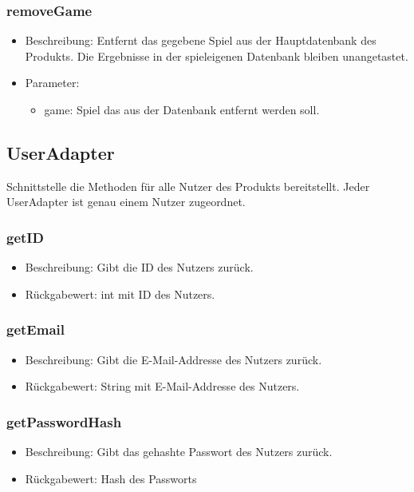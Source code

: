 \documentclass[a4paper]{scrreprt}
\begin{document}
	\subsubsection{removeGame}
	\begin{itemize}
		\item Beschreibung: Entfernt das gegebene Spiel aus der Hauptdatenbank des Produkts.
		Die Ergebnisse in der spieleigenen Datenbank bleiben unangetastet.
		\item Parameter:
		\begin{itemize}
			\item game: Spiel das aus der Datenbank entfernt werden soll.
		\end{itemize}
	\end{itemize}

	\subsection{UserAdapter}
	Schnittstelle die Methoden für alle Nutzer des Produkts bereitstellt.
	Jeder UserAdapter ist genau einem Nutzer zugeordnet.

	\subsubsection{getID}
	\begin{itemize}
		\item Beschreibung: Gibt die ID des Nutzers zurück.
		\item Rückgabewert: int mit ID des Nutzers.
	\end{itemize}

	\subsubsection{getEmail}
	\begin{itemize}
		\item Beschreibung: Gibt die E-Mail-Addresse des Nutzers zurück.
		\item Rückgabewert: String mit E-Mail-Addresse des Nutzers.
	\end{itemize}

	\subsubsection{getPasswordHash}
	\begin{itemize}
		\item Beschreibung: Gibt das gehashte Passwort des Nutzers zurück.
		\item Rückgabewert: Hash des Passworts
	\end{itemize}
\end{document}
